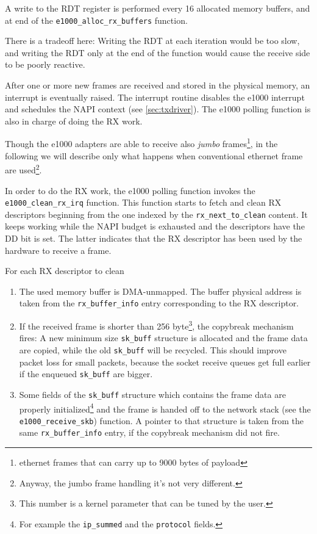 A write to the RDT register is performed every 16 allocated memory buffers, and at end of the \texttt{e1000\_alloc\_rx\_buffers} function.

There is a tradeoff here: Writing the RDT at each iteration would be too slow, and writing the RDT only at the end of the function would
cause the receive side to be poorly reactive.

\vspace{0.5cm}

After one or more new frames are received and stored in the physical memory, an interrupt is eventually raised.
The interrupt routine disables the e1000 interrupt and schedules the NAPI context (see \ref{sec:txdriver}).
The e1000 polling function is also in charge of doing the RX work.

Though the e1000 adapters are able to receive also \emph{jumbo} frames\footnote{ethernet frames that can carry up to 9000 bytes of payload},
in the following we will describe only what happens when conventional ethernet frame are used\footnote{Anyway, the jumbo frame handling 
it's not very different.}.

In order to do the RX work, the e1000 polling function invokes the \texttt{e1000\_clean\_rx\_irq} function.
This function starts to fetch and clean RX descriptors beginning from the one indexed by the \texttt{rx\_next\_to\_clean} content.
It keeps working while the NAPI budget is exhausted and the descriptors have the DD bit is set. The latter indicates that the RX descriptor
has been used by the hardware to receive a frame.

For each RX descriptor to clean
\begin{enumerate}
    \item The used memory buffer is DMA-unmapped. The buffer physical address is taken from the \texttt{rx\_buffer\_info} entry
	  corresponding to the RX descriptor.

    \item If the received frame is shorter than 256 byte\footnote{This number is a kernel parameter that can be tuned by the user.},
	  the copybreak mechanism fires: A new minimum size \texttt{sk\_buff} structure is allocated and the frame data are copied,
	  while the old \texttt{sk\_buff} will be recycled. This should improve packet loss for small packets, because the socket
	  receive queues get full earlier if the enqueued \texttt{sk\_buff} are bigger.
	  
    \item Some fields of the \texttt{sk\_buff} structure which contains the frame data are properly initialized\footnote{For example the
	  \texttt{ip\_summed} and the \texttt{protocol} fields.} and the frame
	  is handed off to the network stack (see the \texttt{e1000\_receive\_skb}) function. A pointer to that structure is
	  taken from the same \texttt{rx\_buffer\_info} entry, if the copybreak mechanism did not fire.
\end{enumerate}



